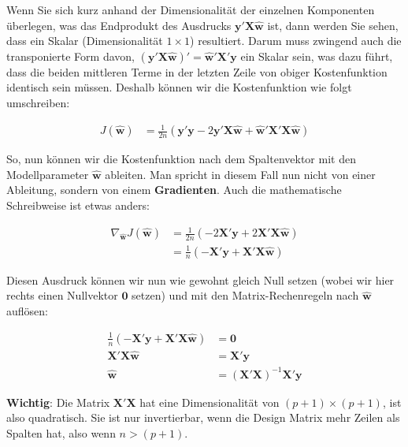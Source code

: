\documentclass[
]{book}
\begin{document}
Wenn Sie sich kurz anhand der Dimensionalität der einzelnen Komponenten überlegen, was das Endprodukt des Ausdrucks \(\mathbf{y}'\mathbf{X}\mathbf{\hat{w}}\) ist, dann werden Sie sehen, dass ein Skalar (Dimensionalität \(1 \times 1\)) resultiert. Darum muss zwingend auch die transponierte Form davon, \((\mathbf{y}'\mathbf{X}\mathbf{\hat{w}})'=\mathbf{\hat{w}}' \mathbf{X}'\mathbf{y}\) ein Skalar sein, was dazu führt, dass die beiden mittleren Terme in der letzten Zeile von obiger Kostenfunktion identisch sein müssen. Deshalb können wir die Kostenfunktion wie folgt umschreiben:

\begin{align}
J(\mathbf{\hat{w}}) &= \frac{1}{2n} (\mathbf{y}'\mathbf{y} - 2\mathbf{y}'\mathbf{X}\mathbf{\hat{w}} + \mathbf{\hat{w}}' \mathbf{X}'\mathbf{X}\mathbf{\hat{w}})
\end{align}

So, nun können wir die Kostenfunktion nach dem Spaltenvektor mit den Modellparameter \(\mathbf{\hat{w}}\) ableiten. Man spricht in diesem Fall nun nicht von einer Ableitung, sondern von einem \textbf{Gradienten}. Auch die mathematische Schreibweise ist etwas anders:

\begin{align}
\nabla_{\mathbf{\hat{w}}} J(\mathbf{\hat{w}}) &= \frac{1}{2n} (- 2\mathbf{X}'\mathbf{y} + 2\mathbf{X}'\mathbf{X}\mathbf{\hat{w}}) \\
&= \frac{1}{n} (-\mathbf{X}'\mathbf{y} + \mathbf{X}'\mathbf{X}\mathbf{\hat{w}})
\end{align}

Diesen Ausdruck können wir nun wie gewohnt gleich Null setzen (wobei wir hier rechts einen Nullvektor \(\mathbf{0}\) setzen) und mit den Matrix-Rechenregeln nach \(\mathbf{\hat{w}}\) auflösen:

\begin{align}
\frac{1}{n} (-\mathbf{X}'\mathbf{y} + \mathbf{X}'\mathbf{X}\mathbf{\hat{w}}) &= \mathbf{0} \\
\mathbf{X}'\mathbf{X}\mathbf{\hat{w}} &= \mathbf{X}'\mathbf{y} \\
\mathbf{\hat{w}} &= (\mathbf{X}'\mathbf{X})^{-1}\mathbf{X}'\mathbf{y}
\end{align}

\textbf{Wichtig}: Die Matrix \(\mathbf{X}'\mathbf{X}\) hat eine Dimensionalität von \((p+1) \times (p+1)\), ist also quadratisch. Sie ist nur invertierbar, wenn die Design Matrix mehr Zeilen als Spalten hat, also wenn \(n > (p+1)\).
\end{document}
